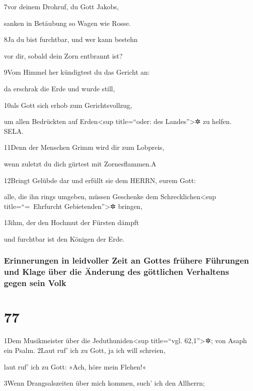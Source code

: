 7vor deinem Drohruf, du Gott Jakobs,

sanken in Betäubung so Wagen wie Rosse.

8Ja du bist furchtbar, und wer kann bestehn

vor dir, sobald dein Zorn entbrannt ist?

9Vom Himmel her kündigtest du das Gericht an:

da erschrak die Erde und wurde still,

10als Gott sich erhob zum Gerichtsvollzug,

um allen Bedrückten auf Erden\textless sup title=``oder: des
Landes''\textgreater✲ zu helfen. SELA.

11Denn der Menschen Grimm wird dir zum Lobpreis,

wenn zuletzt du dich gürtest mit Zornesflammen.{A}

12Bringt Gelübde dar und erfüllt sie dem HERRN, eurem Gott:

alle, die ihn rings umgeben, müssen Geschenke dem
Schrecklichen\textless sup title=``=~Ehrfurcht
Gebietenden''\textgreater✲ bringen,

13ihm, der den Hochmut der Fürsten dämpft

und furchtbar ist den Königen der Erde.

\hypertarget{erinnerungen-in-leidvoller-zeit-an-gottes-fruxfchere-fuxfchrungen-und-klage-uxfcber-die-uxe4nderung-des-guxf6ttlichen-verhaltens-gegen-sein-volk}{%
\subsubsection{Erinnerungen in leidvoller Zeit an Gottes frühere
Führungen und Klage über die Änderung des göttlichen Verhaltens gegen
sein
Volk}\label{erinnerungen-in-leidvoller-zeit-an-gottes-fruxfchere-fuxfchrungen-und-klage-uxfcber-die-uxe4nderung-des-guxf6ttlichen-verhaltens-gegen-sein-volk}}

\hypertarget{section-76}{%
\section{77}\label{section-76}}

1Dem Musikmeister über die Jeduthuniden\textless sup title=``vgl.
62,1''\textgreater✲; von Asaph ein Psalm. 2Laut ruf' ich zu Gott, ja ich
will schreien,

laut ruf' ich zu Gott: »Ach, höre mein Flehen!«

3Wenn Drangsalszeiten über mich kommen, such' ich den Allherrn;

